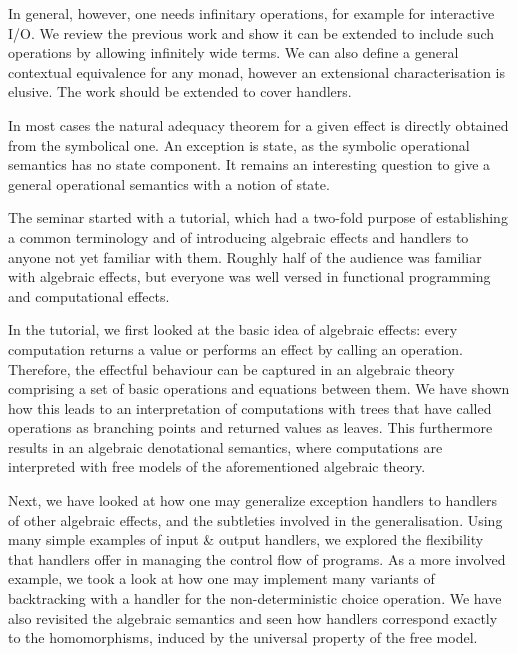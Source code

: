 \documentclass[a4paper,UKenglish]{dagrep}
\begin{document}
In general, however, one needs infinitary operations, for example for interactive I/O. We review the previous work and show it can be extended to include such operations by allowing infinitely wide terms. We can also define a general contextual equivalence for any monad, however an extensional characterisation is elusive. The work should be extended to cover handlers.

In most cases the natural adequacy theorem for a given effect is directly obtained from the symbolical one. An exception is state, as the symbolic operational semantics has no state component. It remains an interesting question to give a general operational semantics with a notion of state.

\license
{}

The seminar started with a tutorial, which had a two-fold purpose of establishing a common terminology and of introducing algebraic effects and handlers to anyone not yet familiar with them. Roughly half of the audience was familiar with algebraic effects, but everyone was well versed in functional programming and computational effects.

In the tutorial, we first looked at the basic idea of algebraic effects: every computation returns a value or performs an effect by calling an operation. Therefore, the effectful behaviour can be captured in an algebraic theory comprising a set of basic operations and equations between them. We have shown how this leads to an interpretation of computations with trees that have called operations as branching points and returned values as leaves. This furthermore results in an algebraic denotational semantics, where computations are interpreted with free models of the aforementioned algebraic theory.

Next, we have looked at how one may generalize exception handlers to handlers of other algebraic effects, and the subtleties involved in the generalisation. Using many simple examples of input \& output handlers, we explored the flexibility that handlers offer in managing the control flow of programs. As a more involved example, we took a look at how one may implement many variants of backtracking with a handler for the non-deterministic choice operation. We have also revisited the algebraic semantics and seen how handlers correspond exactly to the homomorphisms, induced by the universal property of the free model.
\end{document}

